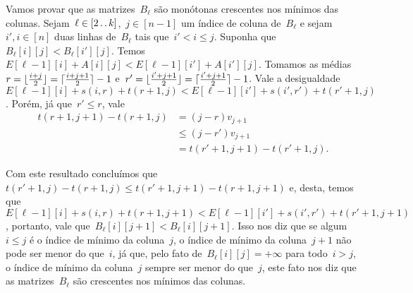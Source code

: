 Vamos provar que as matrizes~$B_\ell$ são monótonas crescentes nos mínimos das colunas. Sejam~${ \ell \in [2 \,.\,.\, k] }$,~${ j \in [n-1] }$ um índice de coluna de~${ B_\ell }$ e sejam~${ i',i \in [n] }$ duas linhas de~$B_\ell$ tais que~${ i' < i \leq j }$. Suponha que~${ B_\ell[i][j] < B_\ell[i'][j] }$. Temos~${ E[\ell-1][i] + A[i][j] < E[\ell-1][i'] + A[i'][j] }$. Tomamos as médias~${ r = \lfloor\frac{i+j}{2}\rfloor = \lceil\frac{i+j+1}{2}\rceil - 1 }$ e~${ r' = \lfloor\frac{i'+j+1}{2}\rfloor = \lceil\frac{i'+j+1}{2}\rceil - 1 }$. Vale a desigualdade~${ E[\ell-1][i] + s(i,r) + t(r+1,j) < E[\ell-1][i'] + s(i',r') + t(r'+1,j) }$. Porém, já que~${ r' \leq r }$, vale
\begin{equation*}
\begin{array}{rl}
t(r+1,j+1) - t(r+1,j) & = (j-r)v_{j+1} \\
& \leq (j-r')v_{j+1} \\
& = t(r'+1,j+1) - t(r'+1,j) \text{.}
\end{array}
\end{equation*}
 
Com este resultado concluímos que~${ t(r'+1,j) - t(r+1,j) \leq t(r'+1,j+1) - t(r+1,j+1) }$ e, desta, temos que~${ E[\ell-1][i] + s(i,r) + t(r+1,j+1) < E[\ell-1][i'] + s(i',r') + t(r'+1,j+1) }$, portanto, vale que~${ B_\ell[i][j+1] < B_\ell[i][j+1] }$. Isso nos diz que se algum~${ i \leq j }$ é o índice de mínimo da coluna~$j$, o índice de mínimo da coluna~${j+1}$ não pode ser menor do que~$i$, já que, pelo fato de~${ B_\ell[i][j] = +\infty }$ para todo~${ i > j }$, o índice de mínimo da coluna~$j$ sempre ser menor do que~$j$, este fato nos diz que as matrizes~$B_\ell$ são crescentes nos mínimos das colunas.
